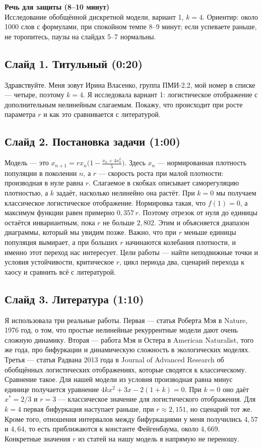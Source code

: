 \documentclass[12pt,a4paper]{article}
\begin{document}
{\LARGE\bfseries Речь для защиты (8--10 минут)}\\[2pt]
Исследование обобщённой дискретной модели, вариант 1, $k=4$. Ориентир: около 1000 слов с формулами, при спокойном темпе 8--9 минут; если успеваете раньше, не торопитесь, паузы на слайдах 5--7 нормальны.

\subsection*{Слайд 1. Титульный (0:20)}
Здравствуйте. Меня зовут Ирина Власенко, группа ПМИ-2.2, мой номер в списке --- четыре, поэтому $k=4$. Я исследовала вариант 1: логистическое отображение с дополнительным нелинейным слагаемым. Покажу, что происходит при росте параметра $r$ и как это сравнивается с литературой.

\subsection*{Слайд 2. Постановка задачи (1:00)}
Модель --- это $x_{n+1}=r x_n\bigl(1-\frac{x_n+4x_n^2}{5}\bigr)$. Здесь $x_n$ --- нормированная плотность популяции в поколении $n$, а $r$ --- скорость роста при малой плотности: производная в нуле равна $r$. Слагаемое в скобках описывает саморегуляцию плотностью, а $k$ задаёт, насколько нелинейно она растёт. При $k=0$ мы получаем классическое логистическое отображение. Нормировка такая, что $f(1)=0$, а максимум функции равен примерно $0{,}357\,r$. Поэтому отрезок от нуля до единицы остаётся инвариантным, пока $r$ не больше $2{,}802$. Этим и объясняется диапазон диаграммы, который мы увидим позже. Важно, что при $r$ меньше единицы популяция вымирает, а при больших $r$ начинаются колебания плотности, и именно этот переход нас интересует. Цели работы --- найти неподвижные точки и условия устойчивости, критическое $r$, цикл периода два, сценарий перехода к хаосу и сравнить всё с литературой.

\subsection*{Слайд 3. Литература (1:10)}
Я использовала три реальные работы. Первая --- статья Роберта Мэя в Nature, 1976 год, о том, что простые нелинейные рекуррентные модели дают очень сложную динамику. Вторая --- работа Мэя и Остера в American Naturalist, того же года, про бифуркации и динамическую сложность в экологических моделях. Третья --- статья Радвана 2013 года в Journal of Advanced Research об обобщённых логистических отображениях, которые сводятся к классическому. Сравнение такое. Для нашей модели из условия производная равна минус единице получается уравнение $4kx^2+3x-2(1+k)=0$. При $k=0$ оно даёт $x^*=2/3$ и $r=3$ --- классическое значение для логистического отображения. Для $k=4$ первая бифуркация наступает раньше, при $r\approx2{,}151$, но сценарий тот же. Кроме того, отношения интервалов между бифуркациями у меня получились $4{,}57$ и $4{,}64$, то есть приближаются к константе Фейгенбаума, около $4{,}669$. Конкретные значения $r$ из статей на нашу модель я напрямую не переношу.
\end{document}
